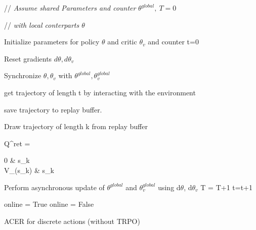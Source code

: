 
\begin{algorithm}[h]
{
// \textit{ Assume shared Parameters and counter} $ \theta^{global} ,\ T = 0 $

// \textit{ with local conterparts $\theta$ }

 Initialize parameters for policy $\theta$ and critic $\theta_v$ and counter t=0
 
 {
  Reset gradients $d\theta, d\theta_v$
  
 {
 Synchronize $ \theta, \theta_v$ with $\theta^{global} ,\theta^{global}_v$
 
 get trajectory of length t by interacting with the environment
 
  save trajectory to replay buffer. 
 }
 
 \Else
 {Draw trajectory of length k from replay buffer}
 
 Q^{ret} = \begin{cases} 
 0 &  s_k  \\
 V_{\theta}(s_k) & s_k 
 \end{cases} %
 
 Perform asynchronous update of $\theta^{global}$ and $\theta^{global}_v$ using d$\theta$, d$\theta_v$
 T = T+1
 t=t+1
}
 {
 online = True
 } 
 \Else
{online = False}
}
\label{ACERALGO}
 \caption{ACER for discrete actions (without TRPO) \citep{ACER}}
\end{algorithm}